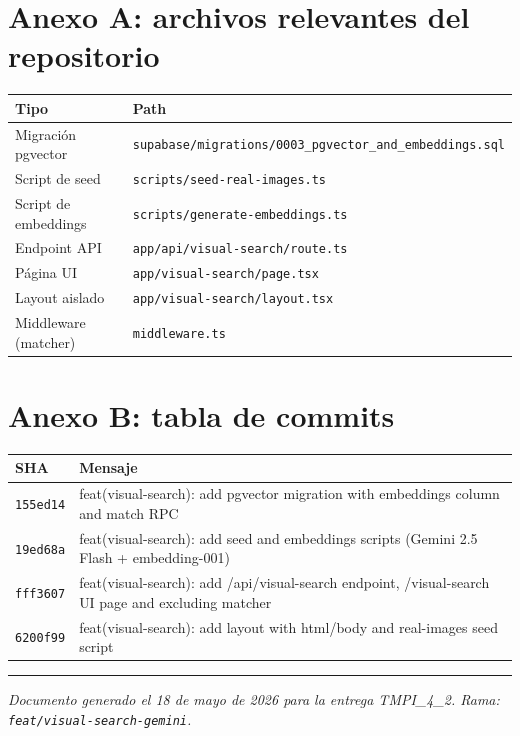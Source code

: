 \documentclass[11pt,letterpaper]{article}
\begin{document}
\appendix
\section{Anexo A: archivos relevantes del repositorio}

\begin{longtable}{@{}l l@{}}
\toprule
\textbf{Tipo} & \textbf{Path} \\
\midrule
Migración pgvector  & \texttt{supabase/migrations/0003\_pgvector\_and\_embeddings.sql} \\
Script de seed      & \texttt{scripts/seed-real-images.ts} \\
Script de embeddings& \texttt{scripts/generate-embeddings.ts} \\
Endpoint API        & \texttt{app/api/visual-search/route.ts} \\
Página UI           & \texttt{app/visual-search/page.tsx} \\
Layout aislado      & \texttt{app/visual-search/layout.tsx} \\
Middleware (matcher)& \texttt{middleware.ts} \\
\bottomrule
\end{longtable}

\section{Anexo B: tabla de commits}

\begin{longtable}{@{}l p{10cm}@{}}
\toprule
\textbf{SHA} & \textbf{Mensaje} \\
\midrule
\texttt{155ed14} & feat(visual-search): add pgvector migration with embeddings column and match RPC \\
\texttt{19ed68a} & feat(visual-search): add seed and embeddings scripts (Gemini 2.5 Flash + embedding-001) \\
\texttt{fff3607} & feat(visual-search): add /api/visual-search endpoint, /visual-search UI page and excluding matcher \\
\texttt{6200f99} & feat(visual-search): add layout with html/body and real-images seed script \\
\bottomrule
\end{longtable}

\vspace{1cm}
\hrule
\vspace{0.3cm}
\noindent\footnotesize\textit{Documento generado el 18 de mayo de 2026 para la entrega TMPI\_4\_2. Rama: \texttt{feat/visual-search-gemini}.}
\end{document}
